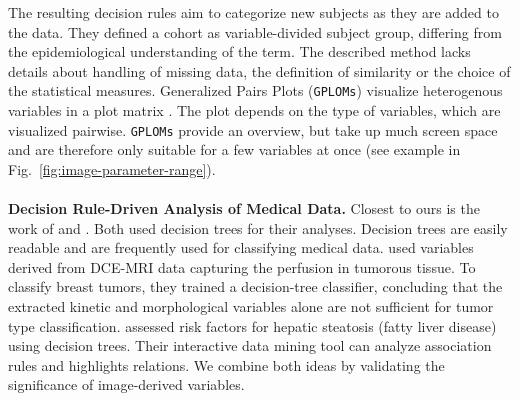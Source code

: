 \documentclass[a4paper,twoside]{style/article}
\begin{document}
The resulting decision rules aim to categorize new subjects as they are added to the data.
They defined a cohort as variable-divided subject group, differing from the epidemiological understanding of the term.
The described method lacks details about handling of missing data, the definition of similarity or the choice of the statistical measures.
Generalized Pairs Plots (\texttt{GPLOMs}) visualize heterogenous variables in a plot matrix \cite{GPLOMS}. %
The plot depends on the type of variables, which are visualized pairwise.
\texttt{GPLOMs} provide an overview, but take up much screen space and are therefore only suitable for a few variables at once (see example in Fig.~\ref{fig:image-parameter-range}).
\\\\
\noindent \textbf{Decision Rule-Driven Analysis of Medical Data.}
Closest to ours is the work of \cite{Glasser2013} and \cite{Niemann2014}.
Both used decision trees for their analyses.
Decision trees are easily readable and are frequently used for classifying medical data.
\cite{Glasser2013} used variables derived from DCE-MRI data capturing the perfusion in tumorous tissue.
To classify breast tumors, they trained a decision-tree classifier, concluding that the extracted kinetic and morphological variables alone are not sufficient for tumor type classification.
\cite{Niemann2014} assessed risk factors for hepatic steatosis (fatty liver disease) using decision trees.
Their interactive data mining tool can analyze association rules and highlights relations.
We combine both ideas by validating the significance of image-derived variables.
\end{document}
